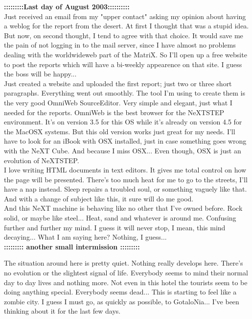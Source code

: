 \documentclass[11pt,twoside,a4paper]{book}
\begin{document}
\begin{multicols*}{2}
\textbf{ {\small :::::::::Last day of August 2003::::::::::} } ~\\ 

Just received an email from my "upper contact" asking my opinion about having a weblog for the report from the desert. At first I thought that was a stupid idea. But now, on second thought, I tend to agree with that choice. It would save me the pain of not logging in to the mail server, since I have almost no problems dealing with the worldwideweb part of the MatriX. So I'll open up a free website to post the reports which will have a bi-weekly appearence on that site. I guess the boss will be happy... ~\\

Just created a website and uploaded the first report; just two or three short paragraphs. Everything went out smoothly. The tool I'm using to create them is the very good OmniWeb SourceEditor. Very simple and elegant, just what I needed for the reports. OmniWeb is the best browser for the NeXTSTEP environment. It's on version 3.5 for this OS while it's already on version 4.5 for the MacOSX systems. But this old version works just great for my needs. I'll have to look for an iBook with OSX installed, just in case something goes wrong with the NeXT Cube. And because I miss OSX... Even though, OSX is just an evolution of NeXTSTEP. ~\\

I love writing HTML documents in text editors. It gives me total control on how the page will be presented. There's too much heat for me to go to the streets, I'll have a nap instead. Sleep repairs a troubled soul, or something vaguely like that. And with a change of subject like this, it sure will do me good. ~\\

And this NeXT machine is behaving like no other that I've owned before. Rock solid, or maybe like steel... Heat, sand and whatever is around me. Confusing further and further my mind. I guess it will never stop, I mean, this mind decaying... What I am saying here? Nothing, I guess... ~\\

\textbf{ {\small ::::::::: another small intermission :::::::::} } %

The situation around here is pretty quiet. Nothing really develops here. There's no evolution or the slightest signal of life. Everybody seems to mind their normal day to day lives and nothing more. Not even in this hotel the tourists seem to be doing anything special. Everybody seems dead... This is starting to feel like a zombie city. I guess I must go, as quickly as possible, to GotaloNia... I've been thinking about it for the last few days. ~\\


\end{multicols*}
\end{document}
